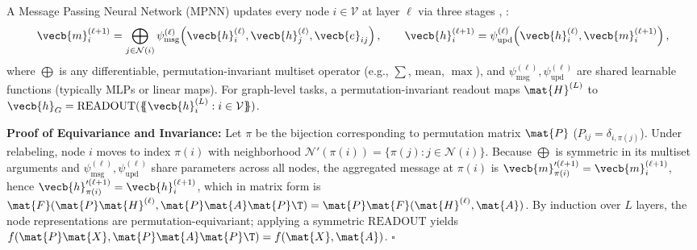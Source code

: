 \documentclass[../../../../master.tex]{subfiles}
\begin{document}
\begin{coremath}
\label{box:gnn:mpnn_proof}
A Message Passing Neural Network (MPNN) updates every node $i \in \mathcal{V}$ at layer $\ell$ via three stages , :
\begin{equation}
  \vecb{m}_i^{(\ell+1)} = \bigoplus_{j \in \mathcal{N}(i)} \psi_{\mathrm{msg}}^{(\ell)}\!\left(\vecb{h}_i^{(\ell)}, \vecb{h}_j^{(\ell)}, \vecb{e}_{ij}\right), \qquad \vecb{h}_i^{(\ell+1)} = \psi_{\mathrm{upd}}^{(\ell)}\!\left(\vecb{h}_i^{(\ell)}, \vecb{m}_i^{(\ell+1)}\right), \label{eq:gnn:mpnn}
\end{equation}
where $\bigoplus$ is any differentiable, permutation-invariant multiset operator (e.g., $\sum$, $\mathrm{mean}$, $\max$), and $\psi_{\mathrm{msg}}^{(\ell)}, \psi_{\mathrm{upd}}^{(\ell)}$ are shared learnable functions (typically MLPs or linear maps). For graph-level tasks, a permutation-invariant readout maps $\mat{H}^{(L)}$ to $\vecb{h}_G = \mathrm{READOUT}(\{\!\!\{\vecb{h}_i^{(L)} : i \in \mathcal{V}\}\!\!\})$.

\textbf{Proof of Equivariance and Invariance:} Let $\pi$ be the bijection corresponding to permutation matrix $\mat{P}$ ($P_{ij} = \delta_{i,\pi(j)}$). Under relabeling, node $i$ moves to index $\pi(i)$ with neighborhood $\mathcal{N}'(\pi(i)) = \{\pi(j) : j \in \mathcal{N}(i)\}$. Because $\bigoplus$ is symmetric in its multiset arguments and $\psi_{\mathrm{msg}}^{(\ell)}, \psi_{\mathrm{upd}}^{(\ell)}$ share parameters across all nodes, the aggregated message at $\pi(i)$ is $\vecb{m}_{\pi(i)}^{\prime(\ell+1)} = \vecb{m}_i^{(\ell+1)}$, hence $\vecb{h}_{\pi(i)}^{\prime(\ell+1)} = \vecb{h}_i^{(\ell+1)}$, which in matrix form is $\mat{F}(\mat{P}\mat{H}^{(\ell)}, \mat{P}\mat{A}\mat{P}\T) = \mat{P}\mat{F}(\mat{H}^{(\ell)}, \mat{A})$. By induction over $L$ layers, the node representations are permutation-equivariant; applying a symmetric $\mathrm{READOUT}$ yields $f(\mat{P}\mat{X}, \mat{P}\mat{A}\mat{P}\T) = f(\mat{X}, \mat{A})$. $\square$
\end{coremath}
\end{document}
